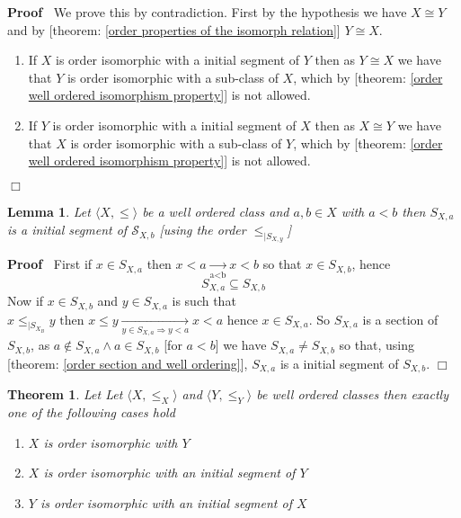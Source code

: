 \documentclass{book}
\newcommand{\Rightarrowlim}{\mathop{\rightarrow}\limits}
\newcommand{\nin}{\not\in}
\newenvironment{proof}{\noindent\textbf{Proof\ }}{\hspace*{\fill}$\Box$\medskip}
\newtheorem{lemma}{Lemma}
\newtheorem{theorem}{Theorem}
\begin{document}
\begin{proof}
  We prove this by contradiction. First by the hypothesis we have $X \cong Y$
  and by [theorem: \ref{order properties of the isomorph relation}] $Y \cong
  X$.
  \begin{enumerate}
    \item If $X$ is order isomorphic with a initial segment of $Y$ then as $Y
    \cong X$ we have that $Y$ is order isomorphic with a sub-class of $X$,
    which by [theorem: \ref{order well ordered isomorphism property}] is not
    allowed.
    
    \item If $Y$ is order isomorphic with a initial segment of $X$ then as $X
    \cong Y$ we have that $X$ is order isomorphic with a sub-class of $Y$,
    which by [theorem: \ref{order well ordered isomorphism property}] is not
    allowed.
  \end{enumerate}
\end{proof}

\begin{lemma}
  \label{order initial segement a<less>b}Let $\langle X, \leqslant \rangle$ be
  a well ordered class and $a, b \in X$ with $a < b$ then $S_{X, a}$ is a
  initial segment of $\mathcal{S}_{X, b}$ [using the order $\leqslant_{|S_{X,
  y}}$]
\end{lemma}

\begin{proof}
  First if $x \in S_{X, a}$ then $x < a \Rightarrowlim_{\text{a<b}} x < b $ so
  that $x \in S_{X, b}$, hence
  \[ S_{X, a} \subseteq S_{X, b} \]
  Now if $x \in S_{X, b}$ and $y \in S_{X, a}$ is such that $x
  \leqslant_{|S_{X_B}} y \text{ then } x \leqslant y \Rightarrowlim_{y \in
  S_{X, a} \Rightarrow y < a} x < a \text{ hence } x \in S_{X, a}$. So $S_{X,
  a}$ is a section of $S_{X, b}$, as $a \nin S_{X, a} \wedge a \in S_{X, b}$
  [for $a < b$] we have $S_{X, a} \neq S_{X, b}$ so that, using [theorem:
  \ref{order section and well ordering}], $S_{X, a}$ is a initial segment of
  $S_{X, b}$.
\end{proof}

\begin{theorem}
  \label{order well ordering and isomorphism (2)}Let Let $\langle X,
  \leqslant_X \rangle$ and $\langle Y, \leqslant_Y \rangle$ be well ordered
  classes then exactly one of the following cases hold
  \begin{enumerate}
    \item $X$ is order isomorphic with $Y$
    
    \item $X$ is order isomorphic with an initial segment of $Y$
    
    \item $Y$ is order isomorphic with an initial segment of $X$
  \end{enumerate}
\end{theorem}
\end{document}
